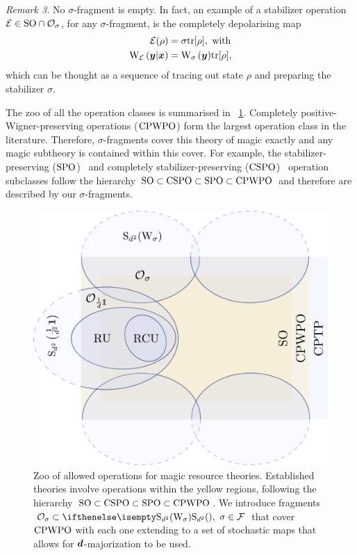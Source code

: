 \emph{Remark 3.} No $\sigma$-fragment is empty.
In fact, an example of a stabilizer operation $\mathcal{E} \in {\rm{SO}} \cap \mathcal{O}_\sigma$, for any $\sigma$-fragment, is the completely depolarising  map
\begin{align}
    \E(\rho) &= \sigma \tr[\rho],\ \text{with} \\
    \W[\bmy|\bmx]{\E} &= \W[\bmy]{\sigma} \tr[\rho],
\end{align}
which can be thought as a sequence of tracing out state $\rho$ and preparing the stabilizer $\sigma$.

The zoo of all the operation classes is summarised in ~\cref{fig:zoo}.
Completely positive-Wigner-preserving operations (${\rm{CPWPO}}$) form the largest operation class in the literature.
Therefore, $\sigma$-fragments cover this theory of magic exactly and any magic subtheory is contained within this cover.
For example, the stabilizer-preserving (${\rm{SPO}}$)~\cite{cit:ahmadi} and completely stabilizer-preserving (${\rm{CSPO}}$)~\cite{cit:seddon} operation subclasses follow the hierarchy ${\rm{SO}} \subset {\rm{CSPO}} \subset {\rm{SPO}} \subset {\rm{CPWPO}}$ and therefore are described by our $\sigma$-fragments.

\begin{figure}
    \centering
        \includegraphics[scale=0.5]{sections/major/operations.pdf}
    \caption{Zoo of allowed operations for magic resource theories.
    Established theories involve operations within the yellow regions, following the hierarchy ${\rm{SO}} \subset {\rm{CSPO}} \subset {\rm{SPO}} \subset {\rm{CPWPO}}$.
    We introduce fragments $\O_\sigma \subset \stochw,\ \sigma \in \F$ that cover ${\rm{CPWPO}}$ with each one extending to a set of stochastic maps that allows for $\bm{d}$-majorization to be used.
    }
    \label{fig:zoo}
\end{figure}